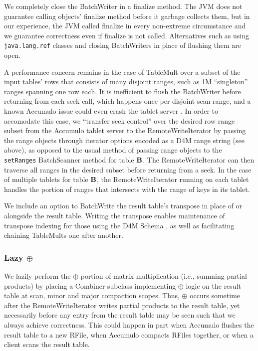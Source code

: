 We completely close the BatchWriter in a finalize method.
The JVM does not guarantee calling objects' finalize method before it garbage collects them, 
but in our experience, the JVM called finalize in every non-extreme circumstance
and we guarantee correctness even if finalize is not called. Alternatives such as using \texttt{java.lang.ref}
classes and closing BatchWriters in place of flushing them are open.

A performance concern remains in the case of TableMult over a subset of the input tables' rows 
that consists of many disjoint ranges, such as 1M ``singleton'' ranges spanning one row each.
It is inefficient to flush the BatchWriter before returning from each seek call, which happens once per 
disjoint scan range, and a known Accumulo issue could even crash the tablet server \cite{ACCUMULO-3710}.
In order to accomodate this case, we ``transfer seek control'' over the desired row range
subset from the Accumulo tablet server to the RemoteWriteIterator by passing the range objects through 
iterator options encoded as a D4M range string (see above), as opposed to the usual method of 
passing range objects to the \texttt{setRanges} BatchScanner method for table $\mathbf{B}$.
The RemoteWriteIterator can then traverse all ranges in the desired subset before returning from a seek.
In the case of multiple tablets for table $\mathbf{B}$, the RemoteWriteIterator running on each tablet handles 
the portion of ranges that intersects with the range of keys in its tablet.

We include an option to BatchWrite the result table's transpose in place of or alongside
the result table. Writing the transpose enables maintenance of transpose indexing for those using the 
D4M Schema \cite{kepner2013d4m}, as well as facilitating chaining TableMults one after another.

\subsubsection{Lazy $\oplus$}
We lazily perform the $\oplus$ portion of matrix multiplication (i.e., summing partial products)
by placing a Combiner subclass implementing $\oplus$ logic on the result table at scan, minor and major compaction scopes.
Thus, $\oplus$ occurs sometime after the RemoteWriteIterator writes partial products to the result table,
yet necessarily before any entry from the result table may be seen such that we always achieve correctness.
This could happen in part when Accumulo flushes the result table to a new RFile, when Accumulo compacts RFiles 
together, or when a client scans the result table. 

